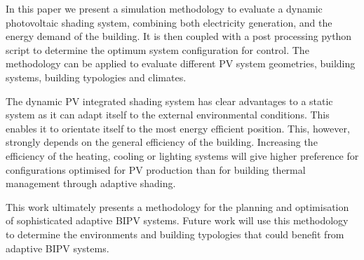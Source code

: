 
In this paper we present a simulation methodology to evaluate a dynamic photovoltaic shading system, combining both electricity generation, and the energy demand of the building. It is then coupled with a post processing python script to determine the optimum system configuration for control. The methodology can be applied to evaluate different PV system geometries, building systems, building typologies and climates.

The dynamic PV integrated shading system has clear advantages to a static system as it can adapt itself to the external environmental conditions. This enables it to orientate itself to the most energy efficient position. This, however, strongly depends on the general efficiency of the building. Increasing the efficiency of the heating, cooling or lighting systems will give higher preference for configurations optimised for PV production than for building thermal management through adaptive shading.


This work ultimately presents a methodology for the planning and optimisation of sophisticated adaptive BIPV systems. Future work will use this methodology to determine the environments and building typologies that could benefit from adaptive BIPV systems. 



